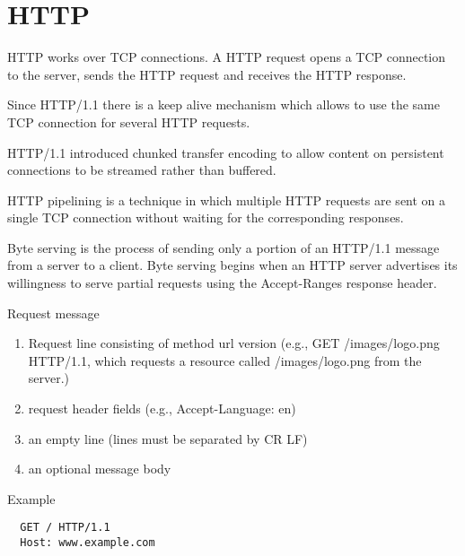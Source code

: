 \section{HTTP}

HTTP works over TCP connections. A HTTP request opens a TCP connection to the
server, sends the HTTP request and receives the HTTP response.

Since HTTP/1.1 there is a keep alive mechanism which allows to use the same
TCP connection for several HTTP requests.

HTTP/1.1 introduced chunked transfer encoding to allow content on persistent
connections to be streamed rather than buffered.

HTTP pipelining is a technique in which multiple HTTP requests are sent on a
single TCP connection without waiting for the corresponding responses.

Byte serving is the process of sending only a portion of an HTTP/1.1 message
from a server to a client. Byte serving begins when an HTTP server advertises
its willingness to serve partial requests using the Accept-Ranges response
header.

\noindent Request message
\begin{enumerate}
\item Request line consisting of method url version (e.g., GET
  /images/logo.png HTTP/1.1, which requests a resource called /images/logo.png
  from the server.)

\item request header fields (e.g., Accept-Language: en)

\item an empty line (lines must be separated by CR LF)

\item an optional message body
\end{enumerate}
%
Example
{\small
\begin{verbatim}
  GET / HTTP/1.1
  Host: www.example.com
\end{verbatim}
}


